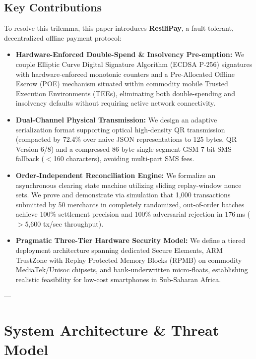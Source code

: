 \documentclass[conference]{IEEEtran}
\begin{document}
\subsection{Key Contributions}
To resolve this trilemma, this paper introduces \textbf{ResiliPay}, a fault-tolerant, decentralized offline payment protocol:
\begin{itemize}
    \item \textbf{Hardware-Enforced Double-Spend \& Insolvency Pre-emption:} We couple Elliptic Curve Digital Signature Algorithm (ECDSA P-256) signatures with hardware-enforced monotonic counters and a Pre-Allocated Offline Escrow (POE) mechanism situated within commodity mobile Trusted Execution Environments (TEEs), eliminating both double-spending and insolvency defaults without requiring active network connectivity.
    \item \textbf{Dual-Channel Physical Transmission:} We design an adaptive serialization format supporting optical high-density QR transmission (compacted by 72.4\% over naive JSON representations to 125 bytes, QR Version 6/8) and a compressed 86-byte single-segment GSM 7-bit SMS fallback ($<$160 characters), avoiding multi-part SMS fees.
    \item \textbf{Order-Independent Reconciliation Engine:} We formalize an asynchronous clearing state machine utilizing sliding replay-window nonce sets. We prove and demonstrate via simulation that 1,000 transactions submitted by 50 merchants in completely randomized, out-of-order batches achieve 100\% settlement precision and 100\% adversarial rejection in 176\,ms ($>$5,600 tx/sec throughput).
    \item \textbf{Pragmatic Three-Tier Hardware Security Model:} We define a tiered deployment architecture spanning dedicated Secure Elements, ARM TrustZone with Replay Protected Memory Blocks (RPMB) on commodity MediaTek/Unisoc chipsets, and bank-underwritten micro-floats, establishing realistic feasibility for low-cost smartphones in Sub-Saharan Africa.
\end{itemize}

---

\section{System Architecture \& Threat Model}
\end{document}
